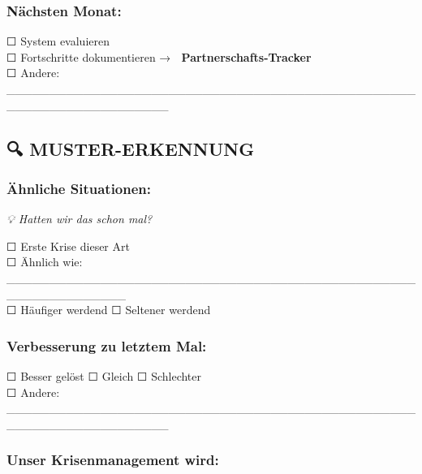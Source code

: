 \hypertarget{nuxe4chsten-monat}{%
\subsubsection{\texorpdfstring{\textbf{Nächsten Monat:}}{Nächsten Monat:}}\label{nuxe4chsten-monat}}

☐ System evaluieren\\
☐ Fortschritte dokumentieren → 📝 \textbf{Partnerschafts-Tracker}\\
☐ Andere: \_\_\_\_\_\_\_\_\_\_\_\_\_\_\_\_\_\_\_\_\_\_\_\_\_\_\_\_\_\_\_\_\_\_\_\_\_\_\_\_\_\_\_\_\_\_\_\_\_\_\_\_\_\_\_\_\_\_\_\_\_\_\_\_\_\_\_

\hypertarget{muster-erkennung}{%
\subsection{\texorpdfstring{\textbf{🔍 MUSTER-ERKENNUNG}}{🔍 MUSTER-ERKENNUNG}}\label{muster-erkennung}}

\hypertarget{uxe4hnliche-situationen}{%
\subsubsection{\texorpdfstring{\textbf{Ähnliche Situationen:}}{Ähnliche Situationen:}}\label{uxe4hnliche-situationen}}

\emph{💡 Hatten wir das schon mal?}

☐ Erste Krise dieser Art\\
☐ Ähnlich wie: \_\_\_\_\_\_\_\_\_\_\_\_\_\_\_\_\_\_\_\_\_\_\_\_\_\_\_\_\_\_\_\_\_\_\_\_\_\_\_\_\_\_\_\_\_\_\_\_\_\_\_\_\_\_\_\_\_\_\_\_\_\_\\
☐ Häufiger werdend ☐ Seltener werdend

\hypertarget{verbesserung-zu-letztem-mal}{%
\subsubsection{\texorpdfstring{\textbf{Verbesserung zu letztem Mal:}}{Verbesserung zu letztem Mal:}}\label{verbesserung-zu-letztem-mal}}

☐ Besser gelöst ☐ Gleich ☐ Schlechter\\
☐ Andere: \_\_\_\_\_\_\_\_\_\_\_\_\_\_\_\_\_\_\_\_\_\_\_\_\_\_\_\_\_\_\_\_\_\_\_\_\_\_\_\_\_\_\_\_\_\_\_\_\_\_\_\_\_\_\_\_\_\_\_\_\_\_\_\_\_\_\_

\hypertarget{unser-krisenmanagement-wird}{%
\subsubsection{\texorpdfstring{\textbf{Unser Krisenmanagement wird:}}{Unser Krisenmanagement wird:}}\label{unser-krisenmanagement-wird}}

